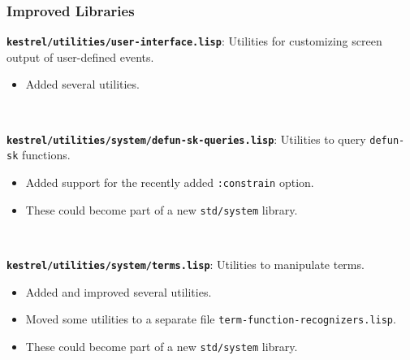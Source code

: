 \documentclass{beamer}
\newcommand{\code}[1]{\texttt{#1}}
\newcommand{\bookpath}[1]{\textbf{\code{#1}}}
\newcommand{\implibtitle}{\frametitle{Improved Libraries}}
\begin{document}

\begin{frame}

\implibtitle

\bookpath{kestrel/utilities/user-interface.lisp}:
Utilities for customizing screen output of user-defined events.
\begin{itemize}
\item
Added several utilities.
\end{itemize}

\

\bookpath{kestrel/utilities/system/defun-sk-queries.lisp}:
Utilities to query \code{defun-sk} functions.
\begin{itemize}
\item
Added support for the recently added \code{:constrain} option.
\item
These could become part of a new \code{std/system} library.
\end{itemize}

\

\bookpath{kestrel/utilities/system/terms.lisp}:
Utilities to manipulate terms.
\begin{itemize}
\item
Added and improved several utilities.
\item
Moved some utilities to a separate file
\code{term-function-recognizers.lisp}.
\item
These could become part of a new \code{std/system} library.
\end{itemize}

\end{frame}

\end{document}
